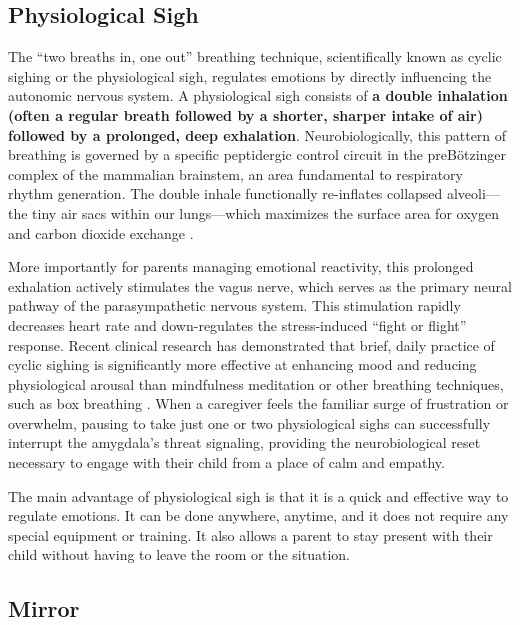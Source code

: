 \subsection{Physiological Sigh}
The ``two breaths in, one out'' breathing technique, scientifically known as cyclic sighing or the physiological sigh, regulates emotions by directly influencing the autonomic nervous system.
A physiological sigh consists of \textbf{a double inhalation (often a regular breath followed by a shorter, sharper intake of air) followed by a prolonged, deep exhalation}.
Neurobiologically, this pattern of breathing is governed by a specific peptidergic control circuit in the preB{\"o}tzinger complex of the mammalian brainstem, an area fundamental to respiratory rhythm generation.
The double inhale functionally re-inflates collapsed alveoli---the tiny air sacs within our lungs---which maximizes the surface area for oxygen and carbon dioxide exchange \citep{li2016}.

More importantly for parents managing emotional reactivity, this prolonged exhalation actively stimulates the vagus nerve, which serves as the primary neural pathway of the parasympathetic nervous system.
This stimulation rapidly decreases heart rate and down-regulates the stress-induced ``fight or flight'' response.
Recent clinical research has demonstrated that brief, daily practice of cyclic sighing is significantly more effective at enhancing mood and reducing physiological arousal than mindfulness meditation or other breathing techniques, such as box breathing \citep{balban2023}.
When a caregiver feels the familiar surge of frustration or overwhelm, pausing to take just one or two physiological sighs can successfully interrupt the amygdala's threat signaling, providing the neurobiological reset necessary to engage with their child from a place of calm and empathy.

The main advantage of physiological sigh is that it is a quick and effective way to regulate emotions. 
It can be done anywhere, anytime, and it does not require any special equipment or training.
It also allows a parent to stay present with their child without having to leave the room or the situation.

\subsection{Mirror}

